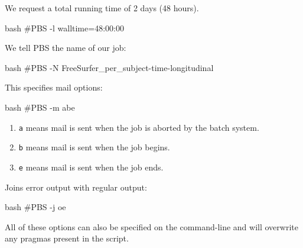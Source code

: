 We request a total running time of 2 days (48 hours).

\begin{code}{bash}
  #PBS -l walltime=48:00:00
\end{code}

We tell PBS the name of our job:

\begin{code}{bash}
  #PBS -N FreeSurfer_per_subject-time-longitudinal
\end{code}

This specifies mail options:

\begin{code}{bash}
  #PBS -m abe
\end{code}

\begin{enumerate}
\item \verb|a| means mail is sent when the job is aborted by the batch system.
\item \verb|b| means mail is sent when the job begins.
\item \verb|e| means mail is sent when the job ends.
\end{enumerate}

Joins error output with regular output:

\begin{code}{bash}
  #PBS -j oe
\end{code}

All of these options can also be specified on the command-line and will
overwrite any pragmas present in the script.
